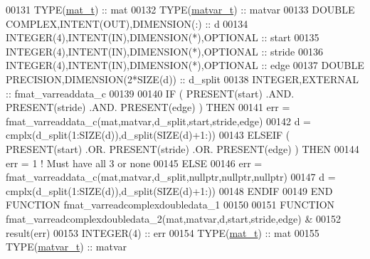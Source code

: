 \begin{DoxyCode}
00131     \textcolor{keywordtype}{TYPE}(\hyperlink{group___m_a_t_gab0fc888f5a5d79943b16284b1f91c2e8}{mat\_t})                                 :: mat
00132     \textcolor{keywordtype}{TYPE}(\hyperlink{group___m_a_t_structmatvar__t}{matvar\_t})                              :: matvar
00133     \textcolor{keywordtype}{DOUBLE COMPLEX},\textcolor{keywordtype}{INTENT(OUT)},\textcolor{keywordtype}{DIMENSION(:)}     :: d
00134     \textcolor{keywordtype}{INTEGER(4)},\textcolor{keywordtype}{INTENT(IN)},\textcolor{keywordtype}{DIMENSION(*)},\textcolor{keywordtype}{OPTIONAL} :: start
00135     \textcolor{keywordtype}{INTEGER(4)},\textcolor{keywordtype}{INTENT(IN)},\textcolor{keywordtype}{DIMENSION(*)},\textcolor{keywordtype}{OPTIONAL} :: stride
00136     \textcolor{keywordtype}{INTEGER(4)},\textcolor{keywordtype}{INTENT(IN)},\textcolor{keywordtype}{DIMENSION(*)},\textcolor{keywordtype}{OPTIONAL} :: edge
00137     \textcolor{keywordtype}{DOUBLE PRECISION},\textcolor{keywordtype}{DIMENSION(2*SIZE(d))}       :: d\_split
00138     \textcolor{keywordtype}{INTEGER},\textcolor{keywordtype}{EXTERNAL}                            :: fmat\_varreaddata\_c
00139 
00140     \textcolor{keywordflow}{IF} ( \textcolor{keyword}{PRESENT}(start) .AND. \textcolor{keyword}{PRESENT}(stride) .AND. \textcolor{keyword}{PRESENT}(edge) ) \textcolor{keywordflow}{THEN}
00141         err = fmat\_varreaddata\_c(mat,matvar,d\_split,start,stride,edge)
00142         d = cmplx(d\_split(1:\textcolor{keyword}{SIZE}(d)),d\_split(\textcolor{keyword}{SIZE}(d)+1:))
00143     \textcolor{keywordflow}{ELSEIF} ( \textcolor{keyword}{PRESENT}(start) .OR. \textcolor{keyword}{PRESENT}(stride) .OR. \textcolor{keyword}{PRESENT}(edge) ) \textcolor{keywordflow}{THEN}
00144         err = 1    \textcolor{comment}{! Must have all 3 or none}
00145     \textcolor{keywordflow}{ELSE}
00146         err = fmat\_varreaddata\_c(mat,matvar,d\_split,nullptr,nullptr,nullptr)
00147         d = cmplx(d\_split(1:\textcolor{keyword}{SIZE}(d)),d\_split(\textcolor{keyword}{SIZE}(d)+1:))
00148 \textcolor{keywordflow}{    ENDIF}
00149 \textcolor{keyword}{END FUNCTION }fmat\_varreadcomplexdoubledata\_1
00150 
00151 \textcolor{keyword}{FUNCTION }fmat\_varreadcomplexdoubledata\_2(mat,matvar,d,start,stride,edge) &
00152                                                              result(err)
00153     \textcolor{keywordtype}{INTEGER(4)}                                  :: err
00154     \textcolor{keywordtype}{TYPE}(\hyperlink{group___m_a_t_gab0fc888f5a5d79943b16284b1f91c2e8}{mat\_t})                                 :: mat
00155     \textcolor{keywordtype}{TYPE}(\hyperlink{group___m_a_t_structmatvar__t}{matvar\_t})                              :: matvar

\end{DoxyCode}
